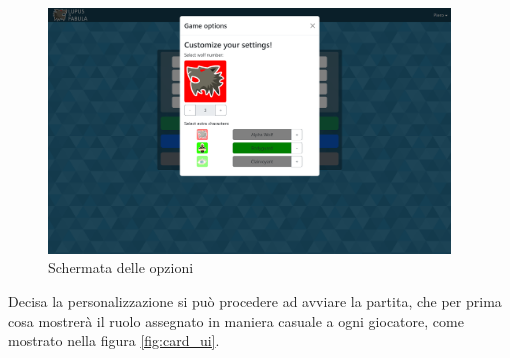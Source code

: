 \begin{figure}[H]
\begin{minipage}{0.25\textwidth}
    \end{minipage}\hfill
    \begin{minipage}{0.75\textwidth}
        \centering
        \includegraphics[width=0.95\textwidth]{img/screen/desktop/option_desktop.png}
    \end{minipage}
    \caption{Schermata delle opzioni}
    \label{fig:option_ui}
\end{figure}

Decisa la personalizzazione si può procedere ad avviare la partita, che per prima cosa mostrerà il ruolo assegnato in maniera casuale a ogni giocatore, come mostrato nella figura \ref{fig:card_ui}.


